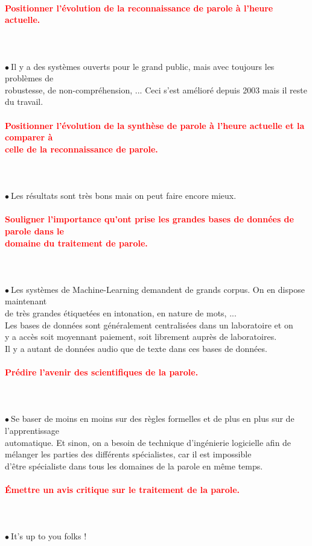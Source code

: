 \documentclass[letterpaper, 12pt]{article}
\newcommand{\alinea}{
\hspace*{0.3cm}}
\newcommand{\red}[1]{
	\textcolor{red}{#1}
}
\newcommand{\point}{$\bullet\ $}
\begin{document}
		\paragraph{\red{Positionner l'évolution de la reconnaissance de parole à l'heure actuelle.}}~\\~\\
			\point Il y a des systèmes ouverts pour le grand public, mais avec toujours les problèmes de 
				\\\alinea robustesse, de non-compréhension, ... Ceci s'est amélioré depuis 2003 mais il reste
				\\\alinea du travail.
		\paragraph{\red{Positionner l'évolution de la synthèse de parole à l'heure actuelle et la comparer à 
		~\\ \hspace*{0.035cm} celle de la reconnaissance de parole.}}~\\~\\
			\point Les résultats sont très bons mais on peut faire encore mieux.
		\paragraph{\red{ Souligner l'importance qu'ont prise les grandes bases de données de parole dans le 
		~\\ \hspace*{0.035cm} domaine du traitement de parole.}}~\\~\\
			\point Les systèmes de Machine-Learning demandent de grands corpus. On en dispose maintenant
				\\\alinea de très grandes étiquetées en intonation, en nature de mots, ...
				\\\alinea Les bases de données sont généralement centralisées dans un laboratoire et on
				\\\alinea y a accès soit moyennant paiement, soit librement auprès de laboratoires.
				\\\alinea Il y a autant de données audio que de texte dans ces bases de données.
		\paragraph{\red{Prédire l'avenir des scientifiques de la parole.}}~\\~\\
			\point Se baser de moins en moins sur des règles formelles et de plus en plus sur de l'apprentissage
				\\\alinea automatique. Et sinon, on a besoin de technique d'ingénierie logicielle afin de
				\\\alinea mélanger les parties des différents spécialistes, car il est impossible 
				\\\alinea d'être spécialiste dans tous les domaines de la parole en même temps.
		\paragraph{\red{Émettre un avis critique sur le traitement de la parole.}}~\\~\\
			\point It's up to you folks !
\end{document}
